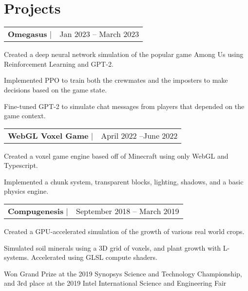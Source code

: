 \documentclass[letterpaper,11pt]{article}
\makeatletter
\newcommand{\resumeSubheadingShort}[3]{
  \begin{tabular*}{0.97\textwidth}[t]{l@{\extracolsep{\fill}}r}
    \textbf{#1} $\vert$ \raisebox{1pt}{\small{#2}} & #3 \\
  \end{tabular*}
}
\newenvironment{resumeSubheadingList}
{\begin{itemize}[leftmargin=0.1in, label={}, noitemsep, topsep=0pt]}
{\end{itemize}}
\newenvironment{resumeListBulleted}[1][0.17in]
{\begin{itemize}[leftmargin=#1, noitemsep, topsep=0pt]\begin{small}}
{\end{small}\end{itemize}}
\newcommand{\link}[2]{\color{blue}{\href{#1}{\underline{#2}}}}
\makeatother
\begin{document}

\section{Projects}
\begin{resumeSubheadingList}
  \item
    \resumeSubheadingShort
    {Omegasus} {\link{https://github.com/pimpale/omegasus}{github.com/pimpale/omegasus}} {Jan 2023 -- March 2023}
    \begin{resumeListBulleted}
      \item Created a deep neural network simulation of the popular game Among Us using Reinforcement Learning and GPT-2.
      \item Implemented PPO to train both the crewmates and the imposters to make decisions based on the game state. 
      \item Fine-tuned GPT-2 to simulate chat messages from players that depended on the game context.
    \end{resumeListBulleted}
  \item
    \resumeSubheadingShort
    {WebGL Voxel Game} {\link{https://github.com/pimpale/webgl-voxel-game}{github.com/pimpale/webgl-voxel-game}} {April 2022 --June 2022}
    \begin{resumeListBulleted}
      \item Created a voxel game engine based off of Minecraft using only WebGL and Typescript. 
      \item Implemented a chunk system, transparent blocks, lighting, shadows, and a basic physics engine.
    \end{resumeListBulleted}
  \item
    \resumeSubheadingShort
    {Compugenesis} {\link{https://github.com/pimpale/compugenesis}{github.com/pimpale/compugenesis}} {September 2018 -- March 2019}
    \begin{resumeListBulleted}
      \item Created a GPU-accelerated simulation of the growth of various real world crops.
      \item Simulated soil minerals using a 3D grid of voxels, and plant growth with L-systems. Accelerated using GLSL compute shaders.
      \item Won Grand Prize at the 2019 Synopsys Science and Technology Championship, and 3rd place at the 2019 Intel International Science and Engineering Fair
    \end{resumeListBulleted}

\end{resumeSubheadingList}
\end{document}
